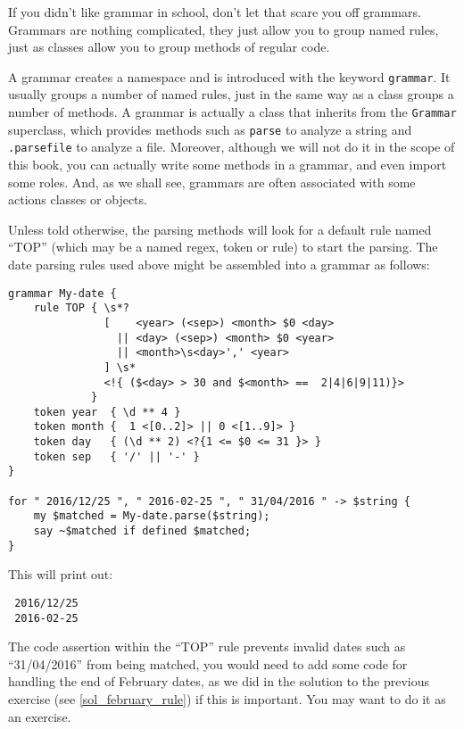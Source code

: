 If you didn't like grammar in school, don't let that 
scare you off grammars. Grammars are nothing complicated, 
they just allow you to group named rules, just as classes 
allow you to group methods of regular code.

A grammar creates a namespace and is introduced with the 
keyword {\tt grammar}. It usually groups a number of 
named rules, just in the same way as a class groups 
a number of methods. A grammar is actually a class that 
inherits from the {\tt Grammar} superclass, which provides 
methods such as {\tt parse} to analyze a string and 
{\tt .parsefile} to analyze a file. Moreover, although 
we will not do it in the scope of this book, you can 
actually write some methods in a grammar, and even import 
some roles. And, as we shall see, grammars are often 
associated with some actions classes or objects.

Unless told otherwise, the parsing methods will look for 
a default rule named ``TOP'' (which may be a named regex, 
token or rule) to start the parsing. The date parsing rules 
used above might be assembled into a grammar as follows:

\label{dategrammar}
\begin{verbatim}
grammar My-date {
    rule TOP { \s*? 
               [    <year> (<sep>) <month> $0 <day>
                 || <day> (<sep>) <month> $0 <year> 
                 || <month>\s<day>',' <year>                     
               ] \s* 
               <!{ ($<day> > 30 and $<month> ==  2|4|6|9|11)}>  
             }
    token year  { \d ** 4 }                                        
    token month {  1 <[0..2]> || 0 <[1..9]> }                
    token day   { (\d ** 2) <?{1 <= $0 <= 31 }> }  
    token sep   { '/' || '-' } 
}                         

for " 2016/12/25 ", " 2016-02-25 ", " 31/04/2016 " -> $string {
	my $matched = My-date.parse($string);
	say ~$matched if defined $matched;
}
\end{verbatim}

This will print out:
\begin{verbatim}
 2016/12/25
 2016-02-25
\end{verbatim}

The code assertion within the ``TOP'' rule prevents invalid 
dates such as ``31/04/2016'' from being matched, you would 
need to add some code for handling the end of February dates,
as we did in the solution to the previous exercise (see 
\ref{sol_february_rule}) if this is important. You may 
want to do it as an exercise.

